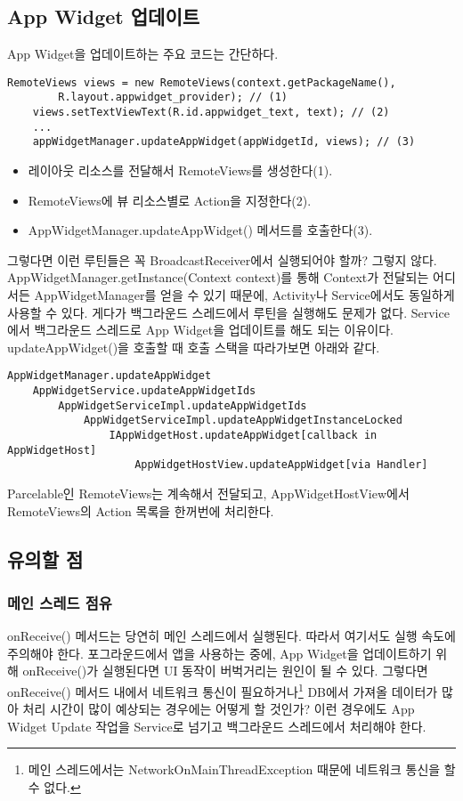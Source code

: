 \subsection{App Widget 업데이트}
App Widget을 업데이트하는 주요 코드는 간단하다.
\begin{lstlisting}[frame=single] 
	RemoteViews views = new RemoteViews(context.getPackageName(),
		R.layout.appwidget_provider); // (1)
	views.setTextViewText(R.id.appwidget_text, text); // (2)
	...
	appWidgetManager.updateAppWidget(appWidgetId, views); // (3)
\end{lstlisting}
\begin{itemize}
\item 레이아웃 리소스를 전달해서 RemoteViews를 생성한다(1).
\item RemoteViews에 뷰 리소스별로 Action을 지정한다(2).
\item AppWidgetManager.updateAppWidget() 메서드를 호출한다(3).
\end{itemize}

그렇다면 이런 루틴들은 꼭 BroadcastReceiver에서 실행되어야 할까? 그렇지 않다. AppWidgetManager.getInstance(Context context)를 통해 Context가 전달되는 어디서든 AppWidgetManager를 얻을 수 있기 때문에, Activity나 Service에서도 동일하게 사용할 수 있다.
게다가 백그라운드 스레드에서 루틴을 실행해도 문제가 없다. Service에서 백그라운드 스레드로 App Widget을 업데이트를 해도 되는 이유이다.\\

updateAppWidget()을 호출할 때 호출 스택을 따라가보면 아래와 같다.
\begin{lstlisting}[frame=single] 
AppWidgetManager.updateAppWidget
	AppWidgetService.updateAppWidgetIds
		AppWidgetServiceImpl.updateAppWidgetIds
			AppWidgetServiceImpl.updateAppWidgetInstanceLocked
				IAppWidgetHost.updateAppWidget[callback in AppWidgetHost]
					AppWidgetHostView.updateAppWidget[via Handler]
\end{lstlisting}
Parcelable인 RemoteViews는 계속해서 전달되고, AppWidgetHostView에서 RemoteViews의 Action 목록을 한꺼번에 처리한다.

\subsection{유의할 점}
\subsubsection{메인 스레드 점유}
onReceive() 메서드는 당연히 메인 스레드에서 실행된다. 따라서 여기서도 실행 속도에 주의해야 한다.
포그라운드에서 앱을 사용하는 중에, App Widget을 업데이트하기 위해 onReceive()가 실행된다면 UI 동작이 버벅거리는 원인이 될 수 있다.
그렇다면 onReceive() 메서드 내에서 네트워크 통신이 필요하거나\footnote{메인 스레드에서는 NetworkOnMainThreadException 때문에 네트워크 통신을 할 수 없다.} DB에서 가져올 데이터가 많아 처리 시간이 많이 예상되는 경우에는 어떻게 할 것인가? 이런 경우에도 App Widget Update 작업을 Service로 넘기고 백그라운드 스레드에서 처리해야 한다.\\

